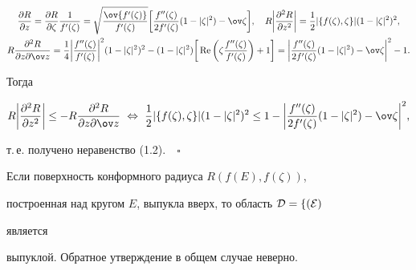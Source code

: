 \begin{gather*} 


\frac{\partial R}{\partial z}=\frac{\partial R}{\partial\zeta} 


\frac{1}{f'(\zeta)}=\sqrt{\frac{\ov{f'(\zeta)}}{f'(\zeta)}} 


\bigg[\frac{f''(\zeta)}{2f'(\zeta)}(1-|\zeta|^2)-\ov\zeta\bigg], 


\quad R\bigg|\frac{\partial^2R}{\partial z^2}\bigg|=\frac{1}{2} 


|\{f(\zeta),\zeta\}|(1-|\zeta|^2)^2, \\ 


% 


R\frac{\partial^2R}{\partial z\partial\ov z}=\frac{1}{4} 


\bigg|\frac{f''(\zeta)}{f'(\zeta)}\bigg|^2(1-|\zeta|^2)^2- 


(1-|\zeta|^2)\bigg[\re\bigg(\zeta\frac{f''(\zeta)}{f'(\zeta)} 


\bigg)+1\bigg]=\bigg|\frac{f''(\zeta)}{2f'(\zeta)} 


(1-|\zeta|^2)-\ov\zeta\bigg|^2-1. 


\end{gather*} 


Тогда 


$$ 


R\bigg|\frac{\partial^2R}{\partial z^2}\bigg|\le-R 


\frac{\partial^2R}{\partial z\partial\ov z}\ \Leftrightarrow 


\ \frac{1}{2}|\{f(\zeta),\zeta\}|(1-|\zeta|^2)^2\le 1-\bigg| 


\frac{f''(\zeta)}{2f'(\zeta)}(1-|\zeta|^2)-\ov\zeta\bigg|^2, 


$$ 


т.\,е. получено неравенство (1.2).$\quad\square$ 


\addtocounter{thm}{3}


 


\begin{thm} 


Если поверхность конформного радиуса $R(f(E),f(\zeta))$, 


построенная над кругом $E$, выпукла вверх, то область $\cal D=f(E)$ 


является 


выпуклой. Обратное утверждение в общем случае неверно. 


\end{thm} 


